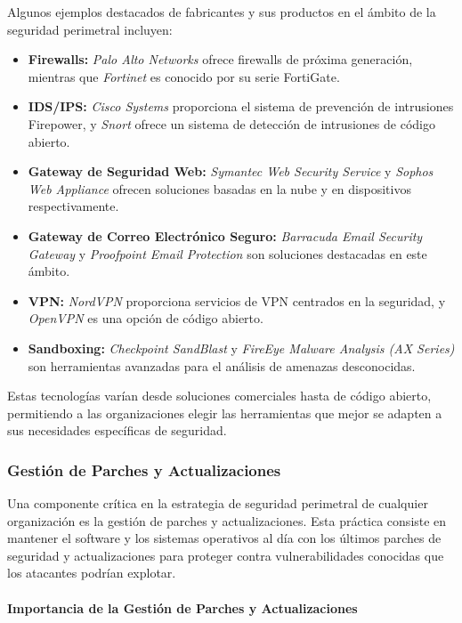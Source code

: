 Algunos ejemplos destacados de fabricantes y sus productos en el ámbito de la seguridad perimetral incluyen:

\begin{itemize}
    \item \textbf{Firewalls:} \textit{Palo Alto Networks} ofrece firewalls de próxima generación, mientras que \textit{Fortinet} es conocido por su serie FortiGate.
    \item \textbf{IDS/IPS:} \textit{Cisco Systems} proporciona el sistema de prevención de intrusiones Firepower, y \textit{Snort} ofrece un sistema de detección de intrusiones de código abierto.
    \item \textbf{Gateway de Seguridad Web:} \textit{Symantec Web Security Service} y \textit{Sophos Web Appliance} ofrecen soluciones basadas en la nube y en dispositivos respectivamente.
    \item \textbf{Gateway de Correo Electrónico Seguro:} \textit{Barracuda Email Security Gateway} y \textit{Proofpoint Email Protection} son soluciones destacadas en este ámbito.
    \item \textbf{VPN:} \textit{NordVPN} proporciona servicios de VPN centrados en la seguridad, y \textit{OpenVPN} es una opción de código abierto.
    \item \textbf{Sandboxing:} \textit{Checkpoint SandBlast} y \textit{FireEye Malware Analysis (AX Series)} son herramientas avanzadas para el análisis de amenazas desconocidas.
\end{itemize}

Estas tecnologías varían desde soluciones comerciales hasta de código abierto, permitiendo a las organizaciones elegir las herramientas que mejor se adapten a sus necesidades específicas de seguridad.



\subsubsection{Gestión de Parches y Actualizaciones}

Una componente crítica en la estrategia de seguridad perimetral de cualquier organización es la gestión de parches y actualizaciones. Esta práctica consiste en mantener el software y los sistemas operativos al día con los últimos parches de seguridad y actualizaciones para proteger contra vulnerabilidades conocidas que los atacantes podrían explotar.

\paragraph{Importancia de la Gestión de Parches y Actualizaciones}

